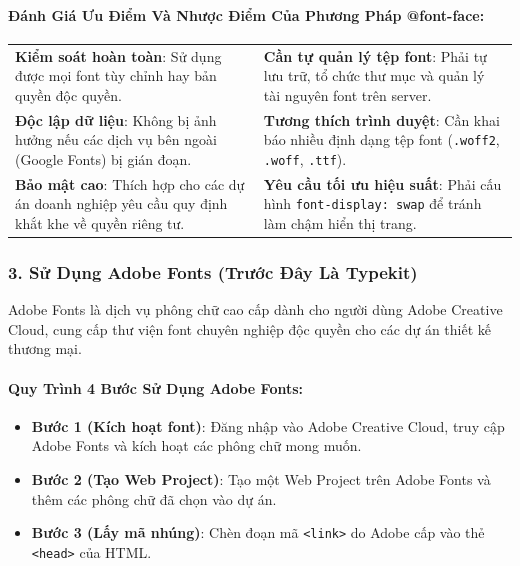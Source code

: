 \documentclass[11pt,oneside]{book}
\newcommand{\thd}[1]{\textcolor{white}{\textbf{\strut #1}}}
\newcommand{\codeinline}[1]{\textcolor{accentOrange}{\texttt{#1}}}
\begin{document}
\paragraph{Đánh Giá Ưu Điểm Và Nhược Điểm Của Phương Pháp @font-face:}

\begin{prettyTableBox}
\sffamily\small
\begin{tabularx}{\linewidth}{|>{\raggedright\arraybackslash}X|>{\raggedright\arraybackslash}X|}
\hline
\rowcolor{primaryBlue} \thd{\sffamily Ưu điểm} & \thd{\sffamily Nhược điểm} \\
\hline
\textcolor{green!60!black}{\textbf{Kiểm soát hoàn toàn}}: Sử dụng được mọi font tùy chỉnh hay bản quyền độc quyền. & \textcolor{red!80!black}{\textbf{Cần tự quản lý tệp font}}: Phải tự lưu trữ, tổ chức thư mục và quản lý tài nguyên font trên server. \\
\hline
\textcolor{green!60!black}{\textbf{Độc lập dữ liệu}}: Không bị ảnh hưởng nếu các dịch vụ bên ngoài (Google Fonts) bị gián đoạn. & \textcolor{red!80!black}{\textbf{Tương thích trình duyệt}}: Cần khai báo nhiều định dạng tệp font (\codeinline{.woff2}, \codeinline{.woff}, \codeinline{.ttf}). \\
\hline
\textcolor{green!60!black}{\textbf{Bảo mật cao}}: Thích hợp cho các dự án doanh nghiệp yêu cầu quy định khắt khe về quyền riêng tư. & \textcolor{red!80!black}{\textbf{Yêu cầu tối ưu hiệu suất}}: Phải cấu hình \codeinline{font-display: swap} để tránh làm chậm hiển thị trang. \\
\hline
\end{tabularx}
\end{prettyTableBox}

\subsubsection{3. Sử Dụng Adobe Fonts (Trước Đây Là Typekit)}

Adobe Fonts là dịch vụ phông chữ cao cấp dành cho người dùng Adobe Creative Cloud, cung cấp thư viện font chuyên nghiệp độc quyền cho các dự án thiết kế thương mại.

\paragraph{Quy Trình 4 Bước Sử Dụng Adobe Fonts:}
\begin{itemize}[leftmargin=1.5em, itemsep=3pt, parsep=0pt]
    \item \textbf{Bước 1 (Kích hoạt font)}: Đăng nhập vào Adobe Creative Cloud, truy cập Adobe Fonts và kích hoạt các phông chữ mong muốn.
    \item \textbf{Bước 2 (Tạo Web Project)}: Tạo một Web Project trên Adobe Fonts và thêm các phông chữ đã chọn vào dự án.
    \item \textbf{Bước 3 (Lấy mã nhúng)}: Chèn đoạn mã \codeinline{<link>} do Adobe cấp vào thẻ \codeinline{<head>} của HTML.
\end{itemize}
\end{document}
